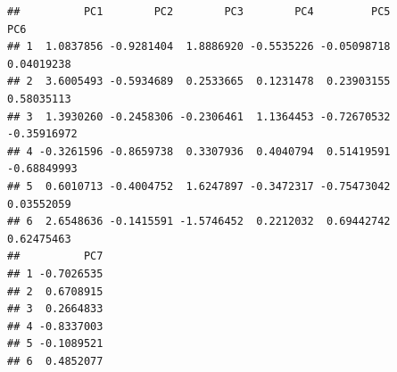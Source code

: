 \documentclass[
]{article}
\newenvironment{Shaded}{\begin{snugshade}}{\end{snugshade}}
\newcommand{\AttributeTok}[1]{\textcolor[rgb]{0.13,0.29,0.53}{#1}}
\newcommand{\FunctionTok}[1]{\textcolor[rgb]{0.13,0.29,0.53}{\textbf{#1}}}
\newcommand{\NormalTok}[1]{#1}
\newcommand{\OtherTok}[1]{\textcolor[rgb]{0.56,0.35,0.01}{#1}}
\newcommand{\SpecialCharTok}[1]{\textcolor[rgb]{0.81,0.36,0.00}{\textbf{#1}}}
\newcommand{\StringTok}[1]{\textcolor[rgb]{0.31,0.60,0.02}{#1}}
\begin{document}
\begin{Shaded}
\end{Shaded}

\begin{verbatim}
##          PC1        PC2        PC3        PC4         PC5         PC6
## 1  1.0837856 -0.9281404  1.8886920 -0.5535226 -0.05098718  0.04019238
## 2  3.6005493 -0.5934689  0.2533665  0.1231478  0.23903155  0.58035113
## 3  1.3930260 -0.2458306 -0.2306461  1.1364453 -0.72670532 -0.35916972
## 4 -0.3261596 -0.8659738  0.3307936  0.4040794  0.51419591 -0.68849993
## 5  0.6010713 -0.4004752  1.6247897 -0.3472317 -0.75473042  0.03552059
## 6  2.6548636 -0.1415591 -1.5746452  0.2212032  0.69442742  0.62475463
##          PC7
## 1 -0.7026535
## 2  0.6708915
## 3  0.2664833
## 4 -0.8337003
## 5 -0.1089521
## 6  0.4852077
\end{verbatim}
\end{document}

